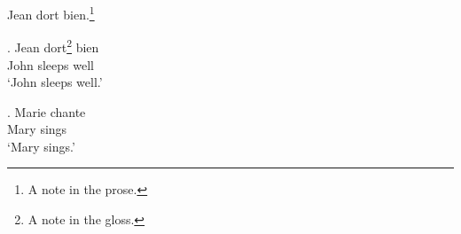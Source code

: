 \documentclass{article}
\begin{document}
Jean dort bien.\footnote{A note in the prose.}

\ex. \gll Jean dort\footnote{A note in the gloss.} bien \\
     John sleeps well \\
     \glt `John sleeps well.'

\ex. \gll Marie chante \\
     Mary sings \\
     \glt `Mary sings.'
\end{document}
